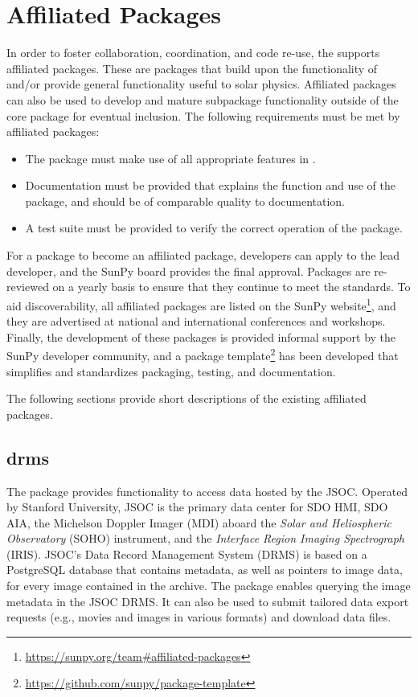 \section{Affiliated Packages}
\label{sec:affil_package}

In order to foster collaboration, coordination, and code re-use, the \sunpyproj supports affiliated packages.
These are \python packages that build upon the functionality of \sunpypkg and/or provide general functionality useful to solar physics.
Affiliated packages can also be used to develop and mature subpackage functionality outside of the \sunpypkg core package for eventual inclusion.
The following requirements must be met by affiliated packages:
\begin{itemize}
    \item The package must make use of all appropriate features in \sunpypkg.
    \item Documentation must be provided that explains the function and use of the package, and should be of comparable quality to \sunpypkg documentation.
    \item A test suite must be provided to verify the correct operation of the package.
\end{itemize}
For a package to become an affiliated package, developers can apply to the lead developer, and the SunPy board provides the final approval.
Packages are re-reviewed on a yearly basis to ensure that they continue to meet the standards.
To aid discoverability, all affiliated packages are listed on the SunPy website\footnote{\url{https://sunpy.org/team\#affiliated-packages}}, and they are advertised at national and international conferences and workshops.
Finally, the development of these packages is provided informal support by the SunPy developer community, and
a package template\footnote{\url{https://github.com/sunpy/package-template}} has been developed that simplifies and standardizes packaging, testing, and documentation.

The following sections provide short descriptions of the existing affiliated packages.

\subsection{drms}
\label{sec:drms}

The  \citep{Glogowski2019drms} package provides functionality to access data hosted by the JSOC.
Operated by Stanford University, JSOC is the primary data center for SDO HMI, SDO AIA, the Michelson Doppler Imager (MDI) aboard the \textit{Solar and Heliospheric Observatory} (SOHO) instrument, and the \textit{Interface Region Imaging Spectrograph} (IRIS).
JSOC's Data Record Management System (DRMS) is based on a PostgreSQL database that contains metadata, as well as pointers to image data, for every image contained in the archive.
The  package enables querying the image metadata in the JSOC DRMS.
It can also be used to submit tailored data export requests (e.g., movies and images in various formats) and download data files.

